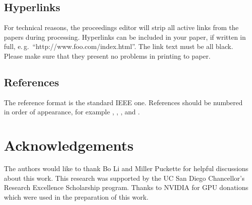 \documentclass[a4paper]{article}
\begin{document}
\subsection{Hyperlinks}

For technical reasons, the proceedings editor will strip all active links from the papers during processing. Hyperlinks can be included in your paper, if written in full, e.\,g.\ ``http://www.foo.com/index.html''. The link text must be all black. 
Please make sure that they present no problems in printing to paper.

\subsection{References}

The reference format is the standard IEEE one. References should be numbered in order of appearance, for example \cite{Davis80-COP}, \cite{Rabiner89-ATO}, \cite[pp.\ 417--422]{Hastie09-TEO}, and \cite{YourName17-XXX}.

\section{Acknowledgements}

The authors would like to thank Bo Li and Miller Puckette for helpful discussions about this work. 
This research was supported by the UC San Diego Chancellor’s Research Excellence Scholarship program.
Thanks to NVIDIA for GPU donations which were used in the preparation of this work.






\end{document}

